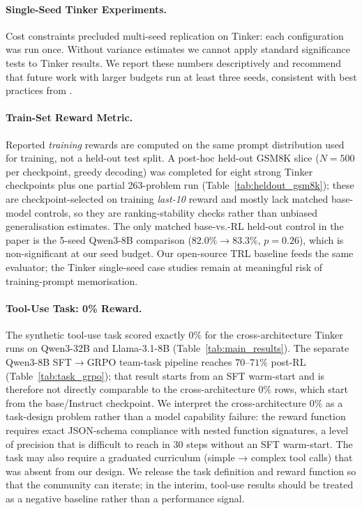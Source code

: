 \documentclass{article}
\begin{document}
\paragraph{Single-Seed Tinker Experiments.}
Cost constraints precluded multi-seed replication on Tinker: each configuration
was run once. Without variance estimates we cannot apply standard significance
tests to Tinker results. We report these numbers descriptively and recommend
that future work with larger budgets run at least three seeds, consistent with
best practices from \citet{henderson2018deep}.

\paragraph{Train-Set Reward Metric.}
Reported \emph{training} rewards are computed on the same prompt
distribution used for training, not a held-out test split. A
post-hoc held-out GSM8K slice (\(N{=}500\) per checkpoint, greedy
decoding) was completed for eight strong Tinker checkpoints plus one
partial 263-problem run (Table~\ref{tab:heldout_gsm8k}); these are
checkpoint-selected on training \emph{last-10} reward and mostly
lack matched base-model controls, so they are ranking-stability
checks rather than unbiased generalisation estimates. The only
matched base-vs.-RL held-out control in the paper is the 5-seed
Qwen3-8B comparison ($82.0\% \to 83.3\%$, $p{=}0.26$), which is
non-significant at our seed budget. Our open-source TRL baseline
feeds the same evaluator; the Tinker single-seed case studies
remain at meaningful risk of training-prompt memorisation.

\paragraph{Tool-Use Task: 0\% Reward.}
The synthetic tool-use task scored exactly $0\%$ for the
cross-architecture Tinker runs on Qwen3-32B and Llama-3.1-8B
(Table~\ref{tab:main_results}). The separate Qwen3-8B SFT$\to$GRPO
team-task pipeline reaches $70$--$71\%$ post-RL
(Table~\ref{tab:task_grpo}); that result starts from an SFT warm-start
and is therefore not directly comparable to the cross-architecture
$0\%$ rows, which start from the base/Instruct checkpoint. We
interpret the cross-architecture $0\%$ as a task-design problem
rather than a model capability failure: the reward function requires
exact JSON-schema compliance with nested function signatures, a
level of precision that is difficult to reach in 30 steps without
an SFT warm-start.
The task may also require a graduated curriculum (simple → complex tool calls)
that was absent from our design. We release the task definition and reward
function so that the community can iterate; in the interim, tool-use results
should be treated as a negative baseline rather than a performance signal.
\end{document}
